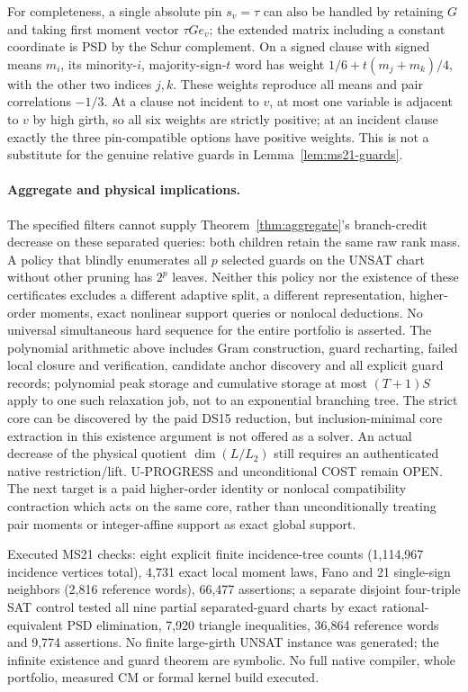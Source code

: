 \documentclass[11pt]{article}
\begin{document}
For completeness, a single absolute pin $s_v=\tau$ can also be handled by retaining $G$ and taking first moment vector $\tau G e_v$; the extended matrix including a constant coordinate is PSD by the Schur complement. On a signed clause with signed means $m_i$, its minority-$i$, majority-sign-$t$ word has weight $1/6+t(m_j+m_k)/4$, with the other two indices $j,k$. These weights reproduce all means and pair correlations $-1/3$. At a clause not incident to $v$, at most one variable is adjacent to $v$ by high girth, so all six weights are strictly positive; at an incident clause exactly the three pin-compatible options have positive weights. This is not a substitute for the genuine relative guards in Lemma~\ref{lem:ms21-guards}.

\paragraph{Aggregate and physical implications.}
The specified filters cannot supply Theorem~\ref{thm:aggregate}'s branch-credit decrease on these separated queries: both children retain the same raw rank mass. A policy that blindly enumerates all $p$ selected guards on the UNSAT chart without other pruning has $2^p$ leaves. Neither this policy nor the existence of these certificates excludes a different adaptive split, a different representation, higher-order moments, exact nonlinear support queries or nonlocal deductions. No universal simultaneous hard sequence for the entire portfolio is asserted. The polynomial arithmetic above includes Gram construction, guard recharting, failed local closure and verification, candidate anchor discovery and all explicit guard records; polynomial peak storage and cumulative storage at most $(T+1)S$ apply to one such relaxation job, not to an exponential branching tree. The strict core can be discovered by the paid DS15 reduction, but inclusion-minimal core extraction in this existence argument is not offered as a solver. An actual decrease of the physical quotient $\dim(L/L_2)$ still requires an authenticated native restriction/lift. U-PROGRESS and unconditional COST remain OPEN. The next target is a paid higher-order identity or nonlocal compatibility contraction which acts on the same core, rather than unconditionally treating pair moments or integer-affine support as exact global support.

Executed MS21 checks: eight explicit finite incidence-tree counts (1,114,967 incidence vertices total), 4,731 exact local moment laws, Fano and 21 single-sign neighbors (2,816 reference words), 66,477 assertions; a separate disjoint four-triple SAT control tested all nine partial separated-guard charts by exact rational-equivalent PSD elimination, 7,920 triangle inequalities, 36,864 reference words and 9,774 assertions. No finite large-girth UNSAT instance was generated; the infinite existence and guard theorem are symbolic. No full native compiler, whole portfolio, measured CM or formal kernel build executed.
\end{document}
